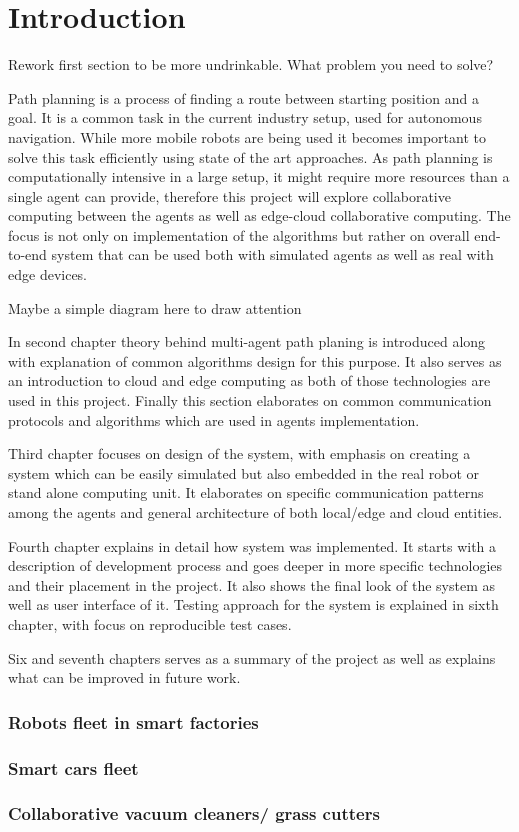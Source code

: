 \chapter{Introduction}
{\color{red}Rework first section to be more undrinkable. What problem you need to solve? }

Path planning is a process of finding a route between starting position and a goal. It is a common task in the current industry setup, used for autonomous navigation. While more mobile robots are being used it becomes important to solve this task efficiently using state of the art approaches. As path planning is computationally intensive in a large setup, it might require more resources than a single agent can provide, therefore this project will explore collaborative computing between the agents as well as edge-cloud collaborative computing. The focus is not only on implementation of the algorithms but rather on overall end-to-end system that can be used both with simulated agents as well as real with edge devices.

{\color{red}Maybe a simple diagram here to draw attention}


In second chapter theory behind multi-agent path planing is introduced along with explanation of common algorithms design for this purpose. It also serves as an introduction to cloud and edge computing as both of those technologies are used in this project. Finally this section elaborates on common communication protocols and algorithms which are used in agents implementation.

Third chapter focuses on design of the system, with emphasis on creating a system which can be easily simulated but also embedded in the real robot or stand alone computing unit. It elaborates on specific communication patterns among the agents and general architecture of both local/edge and cloud entities.

Fourth chapter explains in detail how system was implemented. It starts with a description of development process and goes deeper in more specific technologies and their placement in the project. It also shows the final look of the system as well as user interface of it. Testing approach for the system is explained in sixth chapter, with focus on reproducible test cases.

Six and  seventh chapters serves as a summary of the project as well as explains what can be improved in future work.

\subsection{Robots fleet in smart factories}

\subsection{Smart cars fleet}

\subsection{Collaborative vacuum cleaners/ grass cutters}